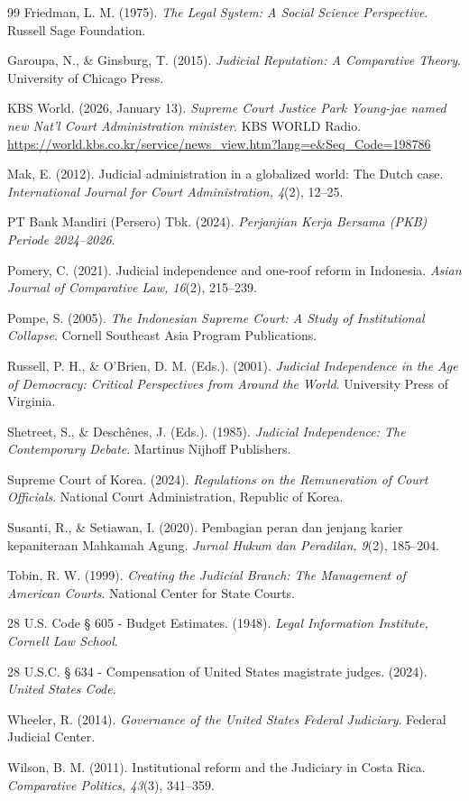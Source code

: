 \documentclass[12pt, a4paper]{article}
\begin{document}
\begin{thebibliography}{99}
Friedman, L. M. (1975). \textit{The Legal System: A Social Science Perspective}. Russell Sage Foundation.

Garoupa, N., \& Ginsburg, T. (2015). \textit{Judicial Reputation: A Comparative Theory}. University of Chicago Press.

KBS World. (2026, January 13). \textit{Supreme Court Justice Park Young-jae named new Nat'l Court Administration minister}. KBS WORLD Radio. \url{https://world.kbs.co.kr/service/news_view.htm?lang=e&Seq_Code=198786}

Mak, E. (2012). Judicial administration in a globalized world: The Dutch case. \textit{International Journal for Court Administration, 4}(2), 12--25.

PT Bank Mandiri (Persero) Tbk. (2024). \textit{Perjanjian Kerja Bersama (PKB) Periode 2024--2026}.

Pomery, C. (2021). Judicial independence and one-roof reform in Indonesia. \textit{Asian Journal of Comparative Law, 16}(2), 215--239.

Pompe, S. (2005). \textit{The Indonesian Supreme Court: A Study of Institutional Collapse}. Cornell Southeast Asia Program Publications.

Russell, P. H., \& O'Brien, D. M. (Eds.). (2001). \textit{Judicial Independence in the Age of Democracy: Critical Perspectives from Around the World}. University Press of Virginia.

Shetreet, S., \& Deschênes, J. (Eds.). (1985). \textit{Judicial Independence: The Contemporary Debate}. Martinus Nijhoff Publishers.

Supreme Court of Korea. (2024). \textit{Regulations on the Remuneration of Court Officials}. National Court Administration, Republic of Korea.

Susanti, R., \& Setiawan, I. (2020). Pembagian peran dan jenjang karier kepaniteraan Mahkamah Agung. \textit{Jurnal Hukum dan Peradilan, 9}(2), 185--204.

Tobin, R. W. (1999). \textit{Creating the Judicial Branch: The Management of American Courts}. National Center for State Courts.

28 U.S. Code § 605 - Budget Estimates. (1948). \textit{Legal Information Institute, Cornell Law School}.

28 U.S.C. § 634 - Compensation of United States magistrate judges. (2024). \textit{United States Code}.

Wheeler, R. (2014). \textit{Governance of the United States Federal Judiciary}. Federal Judicial Center.

Wilson, B. M. (2011). Institutional reform and the Judiciary in Costa Rica. \textit{Comparative Politics, 43}(3), 341--359.
\end{thebibliography}
\end{document}
